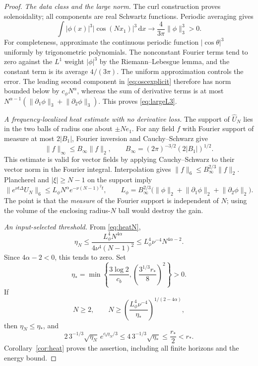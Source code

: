 \documentclass[11pt,a4paper]{article}
\theoremstyle{definition}\newtheorem{definition}[theorem]{Definition}
\theoremstyle{remark}\newtheorem{remark}[theorem]{Remark}
\newcommand{\dd}{\,\mathrm d}
\newcommand{\norm}[1]{\lVert #1\rVert}
\newcommand{\rstar}{r_*}
\newcommand{\cb}{c_b}
\numberwithin{equation}{section}
\begin{document}
\begin{proof}
\emph{The data class and the large norm.}
The curl construction proves solenoidality; all components are real Schwartz functions. Periodic averaging gives
\begin{equation}\label{eq:cosaverage}
 \int |\phi(x)|^3|\cos(Nx_1)|^3\dd x
 \longrightarrow \frac4{3\pi}\norm\phi_3^3>0.
\end{equation}
For completeness, approximate the continuous periodic function $|\cos\theta|^3$ uniformly by trigonometric polynomials. The nonconstant Fourier terms tend to zero against the $L^1$ weight $|\phi|^3$ by the Riemann--Lebesgue lemma, and the constant term is its average $4/(3\pi)$. The uniform approximation controls the error. The leading second component in \eqref{eq:oscexplicit} therefore has norm bounded below by $c_\phi N^\alpha$, whereas the sum of derivative terms is at most
$N^{\alpha-1}(\norm{\partial_1\phi}_3+\norm{\partial_2\phi}_3)$. This proves \eqref{eq:largeL3}.

\emph{A frequency-localized heat estimate with no derivative loss.}
The support of $\widehat U_N$ lies in the two balls of radius one about $\pm Ne_1$. For any field $f$ with Fourier support of measure at most $2|B_1|$, Fourier inversion and Cauchy--Schwarz give
\[
 \norm f_\infty\le B_\infty\norm f_2,\qquad
 B_\infty=(2\pi)^{-3/2}(2|B_1|)^{1/2}.
\]
This estimate is valid for vector fields by applying Cauchy--Schwarz to their vector norm in the Fourier integral. Interpolation gives $\norm f_6\le B_\infty^{2/3}\norm f_2$. Plancherel and $|\xi|\ge N-1$ on the support imply
\begin{equation}\label{eq:heatN}
 \norm{e^{\nu t\Delta}U_N}_6
 \le L_\phi N^\alpha e^{-\nu(N-1)^2t},\qquad
 L_\phi=B_\infty^{2/3}
  \bigl(\norm\phi_2+\norm{\partial_1\phi}_2+\norm{\partial_2\phi}_2\bigr).
\end{equation}
The point is that the \emph{measure} of the Fourier support is independent of $N$; using the volume of the enclosing radius-$N$ ball would destroy the gain.

\emph{An input-selected threshold.}
From \eqref{eq:heatN},
\begin{equation}\label{eq:etaN}
 \eta_N\le\frac{L_\phi^4N^{4\alpha}}{4\nu^4(N-1)^2}
 \le L_\phi^4\nu^{-4}N^{4\alpha-2}.
\end{equation}
Since $4\alpha-2<0$, this tends to zero. Set
\begin{equation}\label{eq:etastar}
 \eta_*=
 \min\left\{\frac{3\log2}{\cb},
              \left(\frac{3^{1/3}\rstar}{8}\right)^2\right\}>0.
\end{equation}
If
\begin{equation}\label{eq:Nthreshold}
 N\ge2,\qquad
 N\ge\left(\frac{L_\phi^4\nu^{-4}}{\eta_*}\right)^{1/(2-4\alpha)},
\end{equation}
then $\eta_N\le\eta_*$, and
\[
 2\,3^{-1/3}\sqrt{\eta_N}\,e^{\cb\eta_N/3}
 \le4\,3^{-1/3}\sqrt{\eta_*}\le\frac{\rstar}{2}<\rstar.
\]
Corollary~\ref{cor:heat} proves the assertion, including all finite horizons and the energy bound.
\end{proof}
\end{document}
